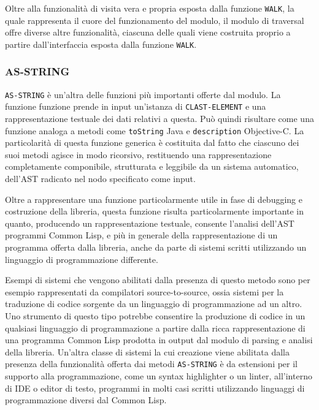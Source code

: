 Oltre alla funzionalità di visita vera e propria esposta dalla funzione
\texttt{WALK}, la quale rappresenta il cuore del funzionamento del modulo, il
modulo di traversal offre diverse altre funzionalità, ciascuna delle quali viene
costruita proprio a partire dall'interfaccia esposta dalla funzione
\texttt{WALK}.

\subsubsection{AS-STRING}

\texttt{AS-STRING} è un'altra delle funzioni più importanti offerte dal modulo.
La funzione funzione prende in input un'istanza di \texttt{CLAST-ELEMENT} e una
rappresentazione testuale dei dati relativi a questa. Può quindi risultare come
una funzione analoga a metodi come \texttt{toString} Java e \texttt{description}
Objective-C. La particolarità di questa funzione generica è costituita dal fatto
che ciascuno dei suoi metodi agisce in modo ricorsivo, restituendo una
rappresentazione completamente componibile, strutturata e leggibile da un
sistema automatico, dell'AST radicato nel nodo specificato come input.

Oltre a rappresentare una funzione particolarmente utile in fase di debugging e
costruzione della libreria, questa funzione risulta particolarmente importante
in quanto, producendo un rappresentazione testuale, consente l'analisi dell'AST
programmi Common Lisp, e più in generale della rappresentazione di un programma
offerta dalla libreria, anche da parte di sistemi scritti utilizzando un
linguaggio di programmazione differente.

Esempi di sistemi che vengono abilitati dalla presenza di questo metodo sono per
esempio rappresentati da compilatori source-to-source, ossia sistemi per la
traduzione di codice sorgente da un linguaggio di programmazione ad un altro.
Uno strumento di questo tipo potrebbe consentire la produzione di codice in un
qualsiasi linguaggio di programmazione a partire dalla ricca rappresentazione di
una programma Common Lisp prodotta in output dal modulo di parsing e analisi
della libreria. Un'altra classe di sistemi la cui creazione viene abilitata
dalla presenza della funzionalità offerta dai metodi \texttt{AS-STRING} è da
estensioni per il supporto alla programmazione, come un syntax highlighter o un
linter, all'interno di IDE o editor di testo, programmi in molti casi scritti
utilizzando linguaggi di programmazione diversi dal Common Lisp.
